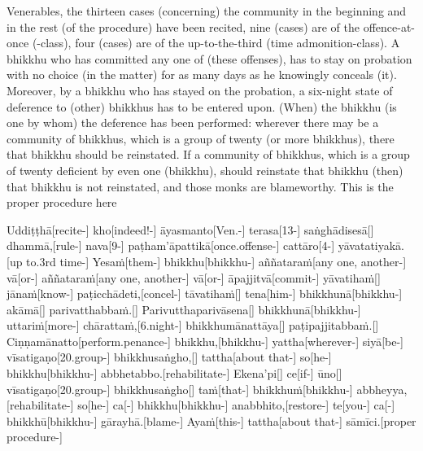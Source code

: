 \documentclass[12pt]{article}
\begin{document}
\begin{paracol}{2}
\begin{column}
{\begin{doublespace}
Venerables, the thirteen cases (concerning) the community in the beginning and in the rest (of the procedure) have been recited, nine (cases) are of the offence-at-once (-class), four (cases) are of the up-to-the-third (time admonition-class). A bhikkhu who has committed any one of (these offenses), has to stay on probation with no choice (in the matter) for as many days as he knowingly conceals (it). Moreover, by a bhikkhu who has stayed on the probation, a six-night state of deference to (other) bhikkhus has to be entered upon. (When) the bhikkhu (is one by whom) the deference has been performed: wherever there may be a community of bhikkhus, which is a group of twenty (or more bhikkhus), there that bhikkhu should be reinstated. If a community of bhikkhus, which is a group of twenty deficient by even one (bhikkhu), should reinstate that bhikkhu (then) that bhikkhu is not reinstated, and those monks are blameworthy. This is the proper procedure here
\end{doublespace}}

\switchcolumn


\begin{flushleft}
\begingl
 Uddiṭṭhā[recite-] kho[indeed!-] āyasmanto[Ven.-] terasa[13-] saṅghādisesā[] dhammā,[rule-] nava[9-] paṭham’āpattikā[once.offense-] cattāro[4-] yāvatatiyakā.[up to.3rd time-] Yesaṁ[them-] bhikkhu[bhikkhu-] aññataraṁ[any one, another-] vā[or-] aññataraṁ[any one, another-] vā[or-] āpajjitvā[commit-] yāvatihaṁ[] jānaṁ[know-] paṭicchādeti,[concel-] tāvatihaṁ[] tena[him-] bhikkhunā[bhikkhu-] akāmā[] parivatthabbaṁ.[] Parivutthaparivāsena[] bhikkhunā[bhikkhu-] uttariṁ[more-] chārattaṁ,[6.night-] bhikkhumānattāya[] paṭipajjitabbaṁ.[] Ciṇṇamānatto[perform.penance-] bhikkhu,[bhikkhu-] yattha[wherever-] siyā[be-] vīsatigaṇo[20.group-] bhikkhusaṅgho,[] tattha[about that-] so[he-] bhikkhu[bhikkhu-] abbhetabbo.[rehabilitate-] Ekena’pi[] ce[if-\NUL{\GMU{}}] ūno[] vīsatigaṇo[20.group-] bhikkhusaṅgho[] taṁ[that-] bhikkhuṁ[bhikkhu-] abbheyya,[rehabilitate-] so[he-] ca[-\NUL{\GMU{}}] bhikkhu[bhikkhu-] anabbhito,[restore-] te[you-] ca[-\NUL{\GMU{}}] bhikkhū[bhikkhu-] gārayhā.[blame-] Ayaṁ[this-] tattha[about that-] sāmīci.[proper procedure-]
\endgl
\switchcolumn*
\end{flushleft}



\end{column}
\end{paracol}
\end{document}
